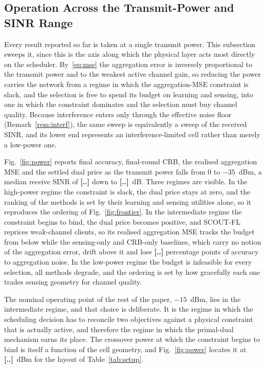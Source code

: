 \documentclass[lettersize,journal]{IEEEtran}
\newcommand{\scout}{SCOUT-FL}
\newcommand{\TBD}[1]{\textbf{[#1]}}
\begin{document}
\subsection{Operation Across the Transmit-Power and SINR Range}\label{sec:power}
Every result reported so far is taken at a single transmit power. This subsection sweeps it, since this is the axis along which the physical layer acts most directly on the scheduler. By~\eqref{eq:mse} the aggregation error is inversely proportional to the transmit power and to the weakest active channel gain, so reducing the power carries the network from a regime in which the aggregation-MSE constraint is slack, and the selection is free to spend its budget on learning and sensing, into one in which the constraint dominates and the selection must buy channel quality. Because interference enters only through the effective noise floor (Remark~\ref{rem:interf}), the same sweep is equivalently a sweep of the received SINR, and its lower end represents an interference-limited cell rather than merely a low-power one.

Fig.~\ref{fig:power} reports final accuracy, final-round CRB, the realised aggregation MSE and the settled dual price as the transmit power falls from $0$ to $-35$~dBm, a median receive SINR of \TBD{..} down to \TBD{..}~dB. Three regimes are visible. In the high-power regime the constraint is slack, the dual price stays at zero, and the ranking of the methods is set by their learning and sensing utilities alone, so it reproduces the ordering of Fig.~\ref{fig:frontier}. In the intermediate regime the constraint begins to bind, the dual price becomes positive, and \scout{} reprices weak-channel clients, so its realised aggregation MSE tracks the budget from below while the sensing-only and CRB-only baselines, which carry no notion of the aggregation error, drift above it and lose \TBD{..} percentage points of accuracy to aggregation noise. In the low-power regime the budget is infeasible for every selection, all methods degrade, and the ordering is set by how gracefully each one trades sensing geometry for channel quality.

The nominal operating point of the rest of the paper, $-15$~dBm, lies in the intermediate regime, and that choice is deliberate. It is the regime in which the scheduling decision has to reconcile two objectives against a physical constraint that is actually active, and therefore the regime in which the primal-dual mechanism earns its place. The crossover power at which the constraint begins to bind is itself a function of the cell geometry, and Fig.~\ref{fig:power} locates it at \TBD{..}~dBm for the layout of Table~\ref{tab:setup}.
\end{document}

